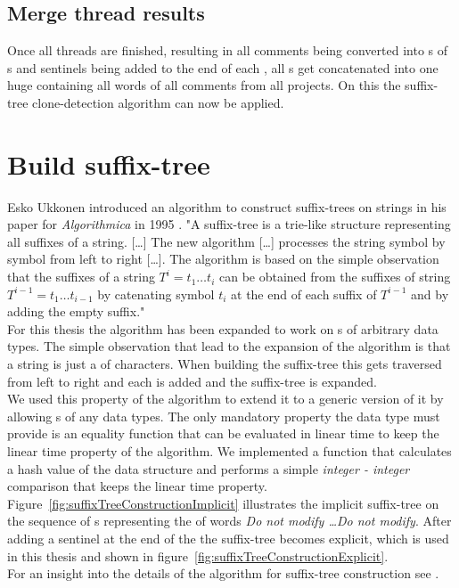 \subsection{Merge thread results}
Once all threads are finished, resulting in all comments being converted into s of s and sentinels being added to the end of each , all s get concatenated into one huge  containing all words of all comments from all projects. On this  the suffix-tree clone-detection algorithm can now be applied.

\section{Build suffix-tree}
Esko Ukkonen introduced an algorithm to construct suffix-trees on strings in his paper for \textit{Algorithmica} in 1995 \cite{Ukkonen1995}. "A suffix-tree is a trie-like structure representing all suffixes of a string. [\dots] The new algorithm [\dots] processes the string symbol by symbol from left to right [\dots]. The algorithm is based on the simple observation that the suffixes of a string $T^i = t_1 \dots t_i$ can be obtained from the suffixes of string $T^{i-1} = t_1 \dots t_{i-1}$ by catenating symbol $t_i$ at the end of each suffix of $T^{i-1}$ and by adding the empty suffix."~\cite[p.~2]{Ukkonen1995}\\
For this thesis the algorithm has been expanded to work on s of arbitrary data types. The simple observation that lead to the expansion of the algorithm is that a string is just a  of characters. When building the suffix-tree this  gets traversed from left to right and each  is added and the suffix-tree is expanded.\\
We used this property of the algorithm to extend it to a generic version of it by allowing s of any data types. The only mandatory property the data type must provide is an equality function that can be evaluated in linear time to keep the linear time property of the algorithm. We implemented a function that calculates a hash value of the data structure and performs a simple \textit{integer - integer} comparison that keeps the linear time property.\\
Figure~\ref{fig:suffixTreeConstructionImplicit} illustrates the implicit suffix-tree on the sequence of s representing the  of words \textit{Do not modify \dots Do not modify}. After adding a sentinel at the end of the  the suffix-tree becomes explicit, which is used in this thesis and shown in figure~\ref{fig:suffixTreeConstructionExplicit}.\\
For an insight into the details of the algorithm for suffix-tree construction see \cite{Ukkonen1995}. 



